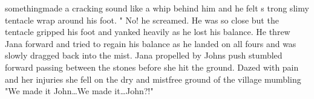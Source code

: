 somethingmade a cracking sound like a whip behind him and he felt s trong slimy tentacle wrap around his foot. " No! he screamed. He was so close but the tentacle gripped his foot and yanked heavily as he lost his balance. He threw Jana forward and tried to regain his balance as he landed on all fours and was slowly dragged back into the mist. Jana propelled by Johns push stumbled forward passing between the stones before she hit the ground. Dazed with pain and her injuries she fell on the dry and mistfree ground of the village mumbling "We made it John\dots We made it\dots John?!"
